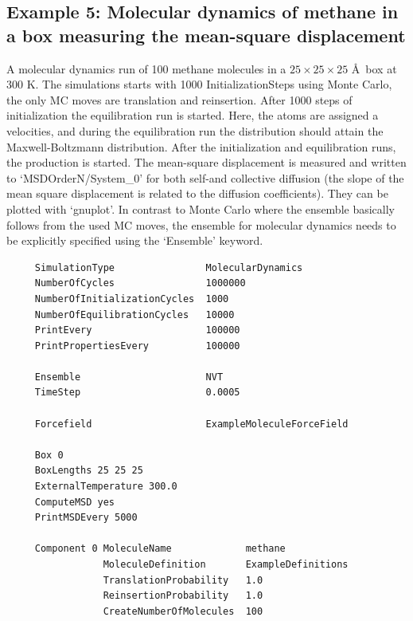 \subsection*{Example 5: Molecular dynamics of methane in a box measuring the mean-square displacement}
A molecular dynamics run of 100 methane molecules in a $25\times25\times25$ \AA\ box at 300 K.
The simulations starts with 1000 InitializationSteps using Monte Carlo, the only MC moves are translation and reinsertion.
After 1000 steps of initialization the equilibration run is started. Here, the atoms are assigned a velocities,
and during the equilibration run the distribution should attain the Maxwell-Boltzmann distribution.
After the initialization and equilibration runs, the production is started. The mean-square displacement is
measured and written to `MSDOrderN/System\_0' for both self-and collective diffusion (the slope of the mean square
displacement is related to the diffusion coefficients). They can be plotted with `gnuplot'.
In contrast to Monte Carlo where the ensemble basically follows from the used MC moves, the ensemble for molecular dynamics
needs to be explicitly specified using the `Ensemble' keyword.

\begin{tiny}
\begin{verbatim}
     SimulationType                MolecularDynamics
     NumberOfCycles                1000000
     NumberOfInitializationCycles  1000
     NumberOfEquilibrationCycles   10000
     PrintEvery                    100000
     PrintPropertiesEvery          100000
     
     Ensemble                      NVT
     TimeStep                      0.0005
     
     Forcefield                    ExampleMoleculeForceField
     
     Box 0
     BoxLengths 25 25 25
     ExternalTemperature 300.0
     ComputeMSD yes
     PrintMSDEvery 5000
     
     Component 0 MoleculeName             methane
                 MoleculeDefinition       ExampleDefinitions
                 TranslationProbability   1.0
                 ReinsertionProbability   1.0
                 CreateNumberOfMolecules  100
\end{verbatim}
\end{tiny}

